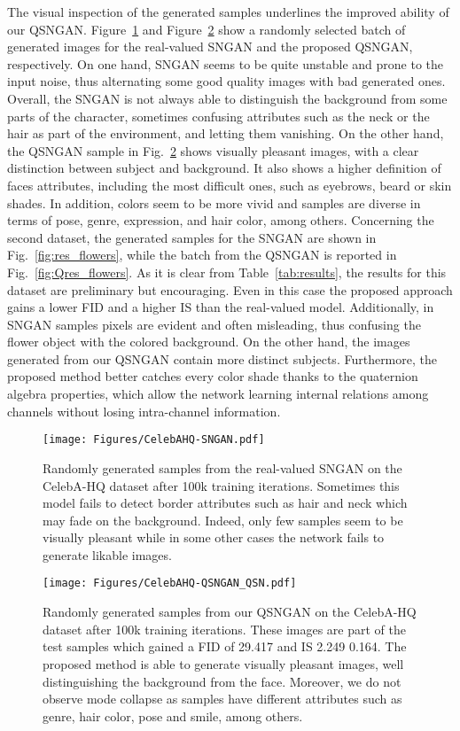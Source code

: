 \documentclass[graybox]{svmult}
\begin{document}
The visual inspection of the generated samples underlines the improved ability of our QSNGAN. Figure~\ref{fig:res_celeba} and Figure~\ref{fig:Qres_celeba} show a randomly selected  batch of generated images for the real-valued SNGAN and the proposed QSNGAN, respectively. On one hand, SNGAN seems to be quite unstable and prone to the input noise, thus alternating some good quality images with bad generated ones. Overall, the SNGAN is not always able to distinguish the background from some parts of the character, sometimes confusing attributes such as the neck or the hair as part of the environment, and letting them vanishing. On the other hand, the QSNGAN sample in Fig.~\ref{fig:Qres_celeba} shows visually pleasant images, with a clear distinction between subject and background. It also shows a higher definition of faces attributes, including the most difficult ones, such as eyebrows, beard or skin shades. In addition, colors seem to be more vivid and samples are diverse in terms of pose, genre, expression, and hair color, among others. 
Concerning the second dataset, the generated samples for the SNGAN are shown in Fig.~\ref{fig:res_flowers}, while the batch from the QSNGAN is reported in Fig.~\ref{fig:Qres_flowers}. As it is clear from Table~\ref{tab:results}, the results for this dataset are preliminary but encouraging. Even in this case the proposed approach gains a lower FID and a higher IS than the real-valued model. Additionally, in SNGAN samples pixels are evident and often misleading, thus confusing the flower object with the colored background. On the other hand, the images generated from our QSNGAN contain more distinct subjects. Furthermore, the proposed method better catches every color shade thanks to the quaternion algebra properties, which allow the network learning internal relations among channels without losing intra-channel information.

\begin{figure}[t]
    \centering
    \texttt{[image: Figures/CelebAHQ-SNGAN.pdf]}
    \caption{Randomly generated samples from the real-valued SNGAN on the CelebA-HQ dataset after 100k training iterations. Sometimes this model fails to detect border attributes such as hair and neck which may fade on the background. Indeed, only few samples seem to be visually pleasant while in some other cases the network fails to generate likable images.}
    \label{fig:res_celeba}
\end{figure}

\begin{figure}[t!]
    \centering
    \texttt{[image: Figures/CelebAHQ-QSNGAN\_QSN.pdf]}
    \caption{Randomly generated samples from our QSNGAN on the CelebA-HQ dataset after 100k training iterations. These images are part of the test samples which gained a FID of 29.417 and IS 2.249  0.164. The proposed method is able to generate visually pleasant images, well distinguishing the background from the face. Moreover, we do not observe mode collapse as samples have different attributes such as genre, hair color, pose and smile, among others.}
    \label{fig:Qres_celeba}
\end{figure}
\end{document}
